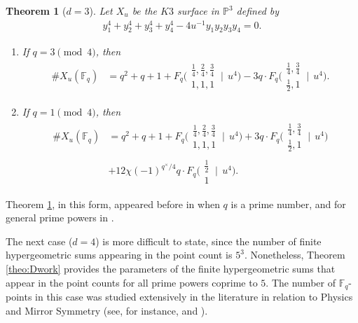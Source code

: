\documentclass[11pt, reqno]{amsart}
\theoremstyle{plain}
\newtheorem{theo}{Theorem}[section]
\theoremstyle{definition}
\newcommand{\Ps}{\mathbb{P}}
\newcommand{\F}{\mathbb{F}}
\begin{document}
\begin{theo}[$d=3$]\label{theo:dwork-3}
Let $X_u$ be the $K3$ surface in $\Ps^{3}$ defined by
\begin{align*}
  y_1^{4}+y_2^{4}+ y_3^{4} + y_{4}^{4} - 4 u^{-1} y_1y_2y_3y_{4}=0.
\end{align*}
\begin{enumerate}
    \item If $q=3 \pmod{4}$, then
    \begin{align*}
    \#X_u(\F_q)
    &= q^2+q+1 +  F_q\biggl(\begin{matrix} \frac{1}{4}, \frac{2}{4}, \frac{3}{4} \\ 1,  1, 1 \end{matrix} \:\bigg|\:\: u^{4} \biggr)- 3 q \cdot  F_q\biggl(\begin{matrix} \frac{1}{4},  \frac{3}{4} \\ \frac{1}{2},  1 \end{matrix} \:\bigg|\:\: u^{4} \biggr).
    \end{align*}
    \item If $q=1 \pmod{4}$, then
    \begin{align*}
     \#X_u(\F_q) 
     &= q^2+q+1 + F_q\biggl(\begin{matrix} \frac{1}{4}, \frac{2}{4}, \frac{3}{4} \\ 1,  1, 1 \end{matrix} \:\bigg|\:\: u^{4} \biggr)+ 3q \cdot F_q\biggl(\begin{matrix} \frac{1}{4},  \frac{3}{4} \\ \frac{1}{2},  1 \end{matrix} \:\bigg|\:\: u^{4} \biggr) \\
     &+12\chi(-1)^{q^{\times}/4} q\cdot  F_q\biggl(\begin{matrix} \frac{1}{2} \\ 1 \end{matrix} \:\bigg|\:\: u^{4} \biggr).
    \end{align*}
\end{enumerate}
\end{theo}
Theorem \ref{theo:dwork-3}, in this form, appeared before in \cite[Theorem 1.1]{goodson-hypergeometric-functions} when $q$ is a prime number, and for general prime powers in \cite[Proposition 3.4.1]{Salerno-Kelly}.

The next case ($d=4$) is more difficult to state, since the number of finite hypergeometric sums appearing in the point count is $5^3$. Nonetheless, Theorem \ref{theo:Dwork} provides the parameters of the finite hypergeometric sums that appear in the point counts for all prime powers coprime to $5$. The number of $\F_q$-points in this case was studied extensively in the literature in relation to Physics and Mirror Symmetry (see, for instance, \cite{villegas-candelas-i} and \cite{Villegas-Candelas-Ossa}). 
\end{document}
